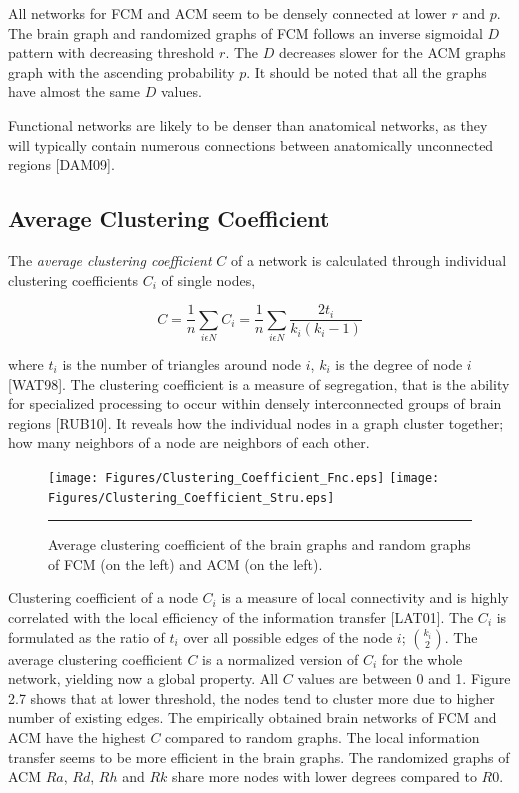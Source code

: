 All networks for FCM and ACM seem to be densely connected at lower $r$ and $p$. The brain graph and randomized graphs of FCM follows an inverse sigmoidal $D$ pattern with decreasing threshold $r$. The $D$ decreases slower for the ACM graphs graph with the ascending probability $p$. It should be noted that all the graphs have almost the same $D$ values. 

Functional networks are likely to be denser than anatomical networks, as they will typically contain numerous connections between anatomically unconnected regions [DAM09]. 

\subsection{Average Clustering Coefficient}
    
The \textit{average clustering coefficient} $C$ of a network is calculated through individual clustering coefficients $C_i$ of single nodes,

\begin{equation}
C = \frac{1}{n} \sum\limits_{i\epsilon N}C_i = \frac{1}{n}\sum\limits_{i\epsilon N} \frac{2t_i}{k_i(k_i -1)}
\end{equation} 

where $t_i$ is the number of triangles around node $i$, $k_i$ is the degree of node $i$ [WAT98]. The clustering coefficient is a measure of segregation, that is the ability for specialized processing to occur within densely interconnected groups of brain regions [RUB10]. It reveals how the individual nodes in a graph cluster together; how many neighbors of a node are neighbors of each other. 

\begin{figure}[htbp]
  \centering
	\texttt{[image: Figures/Clustering\_Coefficient\_Fnc.eps]}
	\texttt{[image: Figures/Clustering\_Coefficient\_Stru.eps]} 
    \rule{35em}{0.5pt}
    \caption[Clustering Coefficient]{Average clustering coefficient of the brain graphs and random graphs of FCM (on the left) and ACM (on the left). }
  \label{fig:Clustering Coefficient}
\end{figure}

Clustering coefficient of a node $C_i$ is a measure of local connectivity and is highly correlated with the local efficiency of the information transfer [LAT01]. The $C_i$ is formulated as the ratio of $t_i$ over all possible edges of the node $i$; ${k_i \choose 2} $. The average clustering coefficient $C$ is a normalized version of $C_i$ for the whole network, yielding now a global property. All $C$ values are between 0 and 1. Figure 2.7 shows that at lower threshold, the nodes tend to cluster more due to higher number of existing edges. The empirically obtained brain networks of FCM and ACM have the highest $C$ compared to random graphs. The local information transfer seems to be more efficient in the brain graphs.  The randomized graphs of ACM $Ra$, $Rd$, $Rh$ and $Rk$ share more nodes with lower degrees compared to $R0$.

